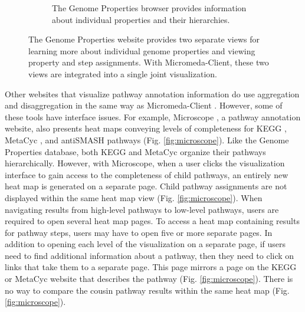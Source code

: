 \begin{figure}
\begin{subfigure}[b]{0.46\textwidth}
         \caption{The Genome Properties browser provides information about individual properties and their hierarchies.}
         \label{fig:property-browser}
     \end{subfigure}
     \caption{The Genome Properties website provides two separate views for learning more about individual genome properties and viewing property and step assignments. With Micromeda-Client, these two views are integrated into a single joint visualization.}
     \label{fig:genome-properties-interface}
\end{figure}

Other websites that visualize pathway annotation information do use aggregation and disaggregation in the same way as Micromeda-Client \cite{vallenet2016microscope,darzi2019functree2}. However, some of these tools have interface issues. For example, Microscope \cite{vallenet2016microscope}, a pathway annotation website, also presents heat maps conveying levels of completeness for KEGG \cite{kanehisa2000kegg}, MetaCyc \cite{karp2002metacyc}, and antiSMASH \cite{blin2019antismash} pathways (Fig. \ref{fig:microscope}). Like the Genome Properties database, both KEGG and MetaCyc organize their pathways hierarchically. However, with Microscope, when a user clicks the visualization interface to gain access to the completeness of child pathways, an entirely new heat map is generated on a separate page. Child pathway assignments are not displayed within the same heat map view (Fig. \ref{fig:microscope}). When navigating results from high-level pathways to low-level pathways, users are required to open several heat map pages. To access a heat map containing results for pathway steps, users may have to open five or more separate pages. In addition to opening each level of the visualization on a separate page, if users need to find additional information about a pathway, then they need to click on links that take them to a separate page. This page mirrors a page on the KEGG or MetaCyc website that describes the pathway (Fig. \ref{fig:microscope}). There is no way to compare the cousin pathway results within the same heat map (Fig. \ref{fig:microscope}).

